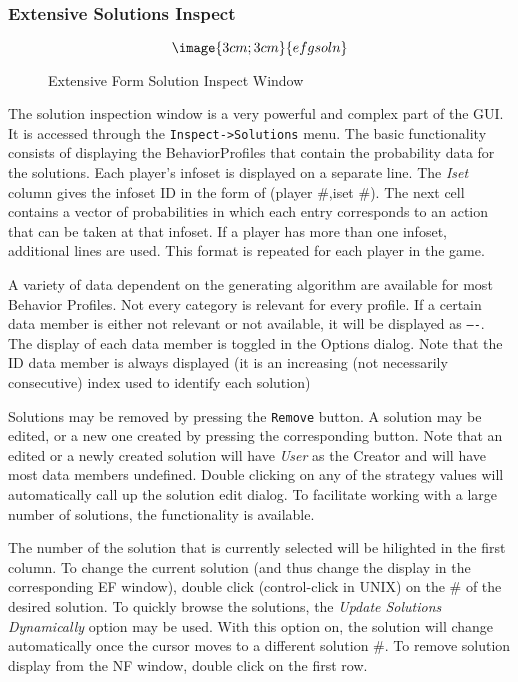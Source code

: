 \subsubsection{Extensive Solutions Inspect}\label{ExtensiveSolutionInspect}
\begin{figure}
$$\image{3cm;3cm}{efgsoln}$$
\caption{Extensive Form Solution Inspect Window}\label{fig_efgsoln}
\end{figure}

The solution inspection window is a very powerful and complex part of the GUI.
It is accessed through the {\tt Inspect->Solutions} menu.
The basic functionality consists of displaying the BehaviorProfiles that contain the
probability data for the solutions.  Each player's infoset is displayed on a separate
line.  The {\em Iset} column gives the infoset ID in the form of (player \#,iset \#).
The next cell contains a vector of probabilities in which each entry corresponds to
an action that can be taken at that infoset.  If a player has more than one infoset,
additional lines are used.  This format is repeated for each player in the game.

A variety of data dependent on the generating algorithm are available for most
 Behavior Profiles. Not every category is relevant for every profile.  If a
certain data member is either not relevant or not available, it will be 
displayed as {\tt ----}.  The display of each data member is toggled in the
Options dialog.  Note that the ID data member is always displayed (it is
an increasing (not necessarily consecutive) index used to identify each
solution)

Solutions may be removed by pressing the {\tt Remove} button.  A solution may
be edited, or a new one created by pressing the corresponding button.  Note 
that an edited or a newly created solution will have {\em User} as the
Creator and will have most data members undefined.  Double clicking on any
of the strategy values will automatically call up the solution edit dialog.
To facilitate working with a large number of solutions, 
the  functionality is available.

The number of the solution that is currently selected will be hilighted in the first
column.  To change the current solution (and thus change the display in the 
corresponding EF window), double click (control-click in UNIX) on the \# of the
desired solution.  To quickly browse the solutions, the {\em Update Solutions Dynamically}
option may be used.  With this option on, the solution will change automatically once
the cursor moves to a different solution \#.  To remove solution display from the NF window,
double click on the first row.

